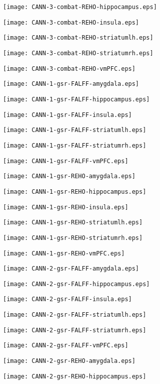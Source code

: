 \documentclass{article}
\begin{document}
\texttt{[image: CANN-3-combat-REHO-hippocampus.eps]}

\newpage
\texttt{[image: CANN-3-combat-REHO-insula.eps]}

\newpage
\texttt{[image: CANN-3-combat-REHO-striatumlh.eps]}

\newpage
\texttt{[image: CANN-3-combat-REHO-striatumrh.eps]}

\newpage
\texttt{[image: CANN-3-combat-REHO-vmPFC.eps]}

\newpage
\texttt{[image: CANN-1-gsr-FALFF-amygdala.eps]}

\newpage
\texttt{[image: CANN-1-gsr-FALFF-hippocampus.eps]}

\newpage
\texttt{[image: CANN-1-gsr-FALFF-insula.eps]}

\newpage
\texttt{[image: CANN-1-gsr-FALFF-striatumlh.eps]}

\newpage
\texttt{[image: CANN-1-gsr-FALFF-striatumrh.eps]}

\newpage
\texttt{[image: CANN-1-gsr-FALFF-vmPFC.eps]}

\newpage
\texttt{[image: CANN-1-gsr-REHO-amygdala.eps]}

\newpage
\texttt{[image: CANN-1-gsr-REHO-hippocampus.eps]}

\newpage
\texttt{[image: CANN-1-gsr-REHO-insula.eps]}

\newpage
\texttt{[image: CANN-1-gsr-REHO-striatumlh.eps]}

\newpage
\texttt{[image: CANN-1-gsr-REHO-striatumrh.eps]}

\newpage
\texttt{[image: CANN-1-gsr-REHO-vmPFC.eps]}

\newpage
\texttt{[image: CANN-2-gsr-FALFF-amygdala.eps]}

\newpage
\texttt{[image: CANN-2-gsr-FALFF-hippocampus.eps]}

\newpage
\texttt{[image: CANN-2-gsr-FALFF-insula.eps]}

\newpage
\texttt{[image: CANN-2-gsr-FALFF-striatumlh.eps]}

\newpage
\texttt{[image: CANN-2-gsr-FALFF-striatumrh.eps]}

\newpage
\texttt{[image: CANN-2-gsr-FALFF-vmPFC.eps]}

\newpage
\texttt{[image: CANN-2-gsr-REHO-amygdala.eps]}

\newpage
\texttt{[image: CANN-2-gsr-REHO-hippocampus.eps]}
\end{document}
